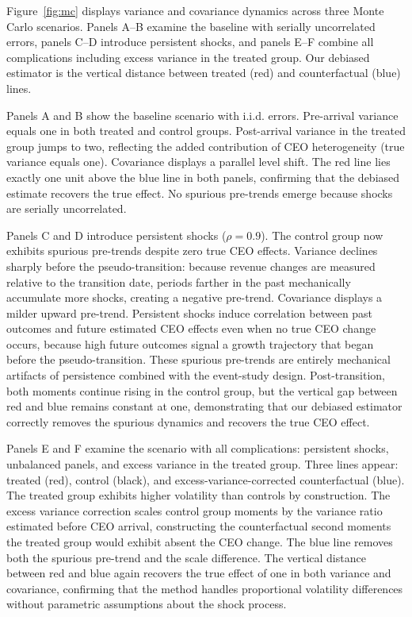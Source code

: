 \documentclass[11pt,a4paper]{article}
\begin{document}
Figure~\ref{fig:mc} displays variance and covariance dynamics across three Monte Carlo scenarios. Panels A--B examine the baseline with serially uncorrelated errors, panels C--D introduce persistent shocks, and panels E--F combine all complications including excess variance in the treated group. Our debiased estimator is the vertical distance between treated (red) and counterfactual (blue) lines.

Panels A and B show the baseline scenario with i.i.d. errors. Pre-arrival variance equals one in both treated and control groups. Post-arrival variance in the treated group jumps to two, reflecting the added contribution of CEO heterogeneity (true variance equals one). Covariance displays a parallel level shift. The red line lies exactly one unit above the blue line in both panels, confirming that the debiased estimate recovers the true effect. No spurious pre-trends emerge because shocks are serially uncorrelated.

Panels C and D introduce persistent shocks ($\rho=0.9$). The control group now exhibits spurious pre-trends despite zero true CEO effects. Variance declines sharply before the pseudo-transition: because revenue changes are measured relative to the transition date, periods farther in the past mechanically accumulate more shocks, creating a negative pre-trend. Covariance displays a milder upward pre-trend. Persistent shocks induce correlation between past outcomes and future estimated CEO effects even when no true CEO change occurs, because high future outcomes signal a growth trajectory that began before the pseudo-transition. These spurious pre-trends are entirely mechanical artifacts of persistence combined with the event-study design. Post-transition, both moments continue rising in the control group, but the vertical gap between red and blue remains constant at one, demonstrating that our debiased estimator correctly removes the spurious dynamics and recovers the true CEO effect.

Panels E and F examine the scenario with all complications: persistent shocks, unbalanced panels, and excess variance in the treated group. Three lines appear: treated (red), control (black), and excess-variance-corrected counterfactual (blue). The treated group exhibits higher volatility than controls by construction. The excess variance correction scales control group moments by the variance ratio estimated before CEO arrival, constructing the counterfactual second moments the treated group would exhibit absent the CEO change. The blue line removes both the spurious pre-trend and the scale difference. The vertical distance between red and blue again recovers the true effect of one in both variance and covariance, confirming that the method handles proportional volatility differences without parametric assumptions about the shock process.
\end{document}
